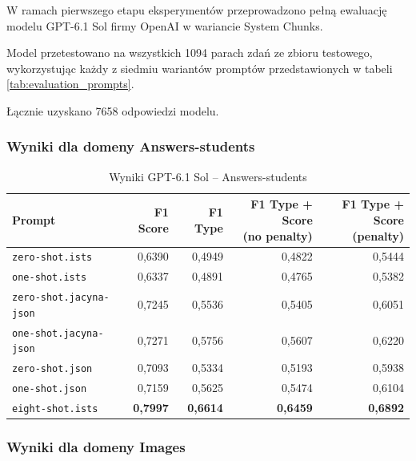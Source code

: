 \documentclass[a4paper,10pt]{article}
\begin{document}
W ramach pierwszego etapu eksperymentów przeprowadzono
pełną ewaluację modelu GPT-6.1 Sol firmy OpenAI
w wariancie System Chunks.

Model przetestowano na wszystkich 1094 parach zdań
ze zbioru testowego, wykorzystując każdy z siedmiu
wariantów promptów przedstawionych w tabeli
\ref{tab:evaluation_prompts}.

Łącznie uzyskano 7658 odpowiedzi modelu.


\subsubsection{Wyniki dla domeny Answers-students}

\begin{table}[htbp]
    \centering
    \small
    \caption{Wyniki GPT-6.1 Sol -- Answers-students}
    \label{tab:sol_answers}
    \begin{tabular}{lrrrr}
        \toprule
        Prompt
        & F1 Score
        & F1 Type
        & \shortstack{F1 Type + Score\\(no penalty)}
        & \shortstack{F1 Type + Score\\(penalty)} \\
        \midrule
        \texttt{zero-shot.ists}
            & 0,6390 & 0,4949 & 0,4822 & 0,5444 \\
        \texttt{one-shot.ists}
            & 0,6337 & 0,4891 & 0,4765 & 0,5382 \\
        \texttt{zero-shot.jacyna-json}
            & 0,7245 & 0,5536 & 0,5405 & 0,6051 \\
        \texttt{one-shot.jacyna-json}
            & 0,7271 & 0,5756 & 0,5607 & 0,6220 \\
        \texttt{zero-shot.json}
            & 0,7093 & 0,5334 & 0,5193 & 0,5938 \\
        \texttt{one-shot.json}
            & 0,7159 & 0,5625 & 0,5474 & 0,6104 \\
        \texttt{eight-shot.ists}
            & \textbf{0,7997}
            & \textbf{0,6614}
            & \textbf{0,6459}
            & \textbf{0,6892} \\
        \bottomrule
    \end{tabular}
\end{table}


\subsubsection{Wyniki dla domeny Images}
\end{document}
